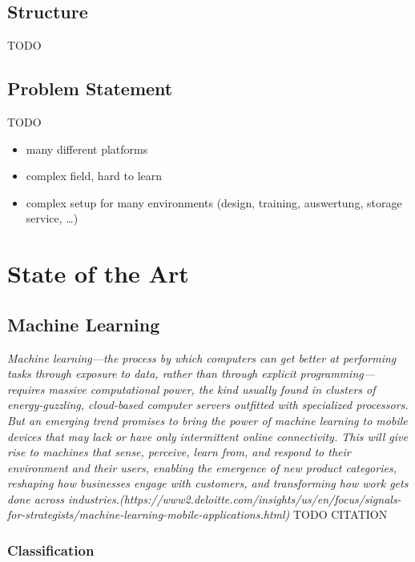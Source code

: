 \section{Structure}\label{structure}

TODO

\section{Problem Statement}\label{problem-statement}

TODO

\begin{itemize}
\tightlist
\item
  many different platforms
\item
  complex field, hard to learn
\item
  complex setup for many environments (design, training, auswertung,
  storage service, \ldots{})
\end{itemize}

\chapter{State of the Art}\label{state-of-the-art}

\section{Machine Learning}\label{machine-learning}

\emph{Machine learning---the process by which computers can get better
at performing tasks through exposure to data, rather than through
explicit programming---requires massive computational power, the kind
usually found in clusters of energy-guzzling, cloud-based computer
servers outfitted with specialized processors. But an emerging trend
promises to bring the power of machine learning to mobile devices that
may lack or have only intermittent online connectivity. This will give
rise to machines that sense, perceive, learn from, and respond to their
environment and their users, enabling the emergence of new product
categories, reshaping how businesses engage with customers, and
transforming how work gets done across
industries.(https://www2.deloitte.com/insights/us/en/focus/signals-for-strategists/machine-learning-mobile-applications.html)}
TODO CITATION

\subsection{Classification}\label{classification}

